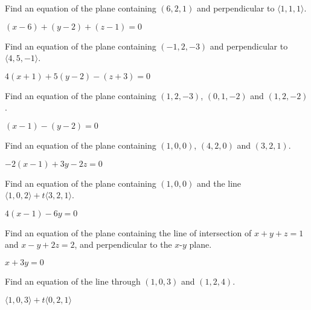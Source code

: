 \begin{enumialphparenastyle}

\begin{ex}
Find an equation of the plane containing $(6,2,1)$ and
perpendicular to $\langle 1,1,1\rangle$.
\begin{sol}
	$(x-6)+(y-2)+(z-1)=0$
\end{sol}
\end{ex}

\begin{ex}
Find an equation of the plane containing $(-1,2,-3)$ and
perpendicular to $\langle 4,5,-1\rangle$.
\begin{sol}
	$4(x+1)+5(y-2)-(z+3)=0$
\end{sol}
\end{ex}

\begin{ex}
Find an equation of the plane containing $(1,2,-3)$,
$(0,1,-2)$ and $(1,2,-2)$.
\begin{sol}
	$(x-1)-(y-2)=0$
\end{sol}
\end{ex}

\begin{ex}
Find an equation of the plane containing $(1,0,0)$,
$(4,2,0)$ and $(3,2,1)$.
\begin{sol}
	$-2(x-1)+3y-2z=0$
\end{sol}
\end{ex}

\begin{ex}
Find an equation of the plane containing $(1,0,0)$ and the
line $\langle 1,0,2\rangle + t\langle 3,2,1\rangle$.
\begin{sol}
	$4(x-1)-6y = 0$
\end{sol}
\end{ex}

\begin{ex}
Find an equation of the plane containing the line of
intersection of $x+y+z=1$ and $x-y+2z=2$, and perpendicular to the
$x$-$y$ plane.
\begin{sol}
	$x+3y=0$
\end{sol}
\end{ex}

\begin{ex}
Find an equation of the line through $(1,0,3)$ and 
$(1,2,4)$.
\begin{sol}
	$\langle 1,0,3\rangle+t\langle 0,2,1\rangle$
\end{sol}
\end{ex}


\end{enumialphparenastyle}
